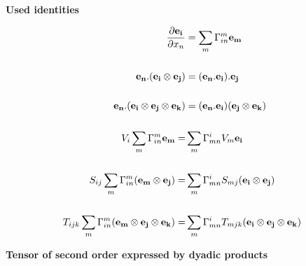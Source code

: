 \documentclass[11pt]{article}
\begin{document}
\begin{landscape}
\noindent
{{\bf{Used identities}}}

\begin{align}
\frac{\partial {\bf{e_i}}}{\partial x_n} & = \sum_m \Gamma_{in}^m {\bf{e_m}} \\
\nonumber \\
{\bf{e_n}}.({\bf{e_i}} \otimes {\bf{e_j}}) & = ({\bf{e_n}}.{\bf{e_i}}).{\bf{e_j}} \\
\nonumber \\
{\bf{e_n}}.({\bf{e_i}} \otimes {\bf{e_j}} \otimes {\bf{e_k}}) & = ({\bf{e_n}}.{\bf{e_i}})({\bf{e_j}} \otimes {\bf{e_k}}) \\
\nonumber \\
V_i \sum_m \Gamma_{in}^m {\bf{e_m}} = & \sum_m \Gamma_{mn}^i V_m {\bf{e_i}} \\
\nonumber \\
S_{ij} \sum_m \Gamma_{in}^m ({\bf{e_m}} \otimes {\bf{e_j}}) = & \sum_m \Gamma_{mn}^i S_{mj} ({\bf{e_i}} \otimes {\bf{e_j}}) \\
\nonumber \\
T_{ijk} \sum_m \Gamma_{in}^m ({\bf{e_m}} \otimes {\bf{e_j}} \otimes {\bf{e_k}}) = & \sum_m \Gamma_{mn}^i T_{mjk} ({\bf{e_i}} \otimes {\bf{e_j}} \otimes {\bf{e_k}})
\end{align}

\noindent
{{\bf{Tensor of second order expressed by dyadic products}}}


\end{landscape}
\end{document}
